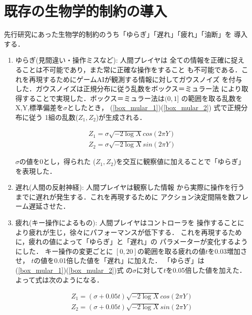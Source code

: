 \documentclass[a4paper,12pt,oneside,openany,titlepage]{jreport}
\begin{document}
 \section{既存の生物学的制約の導入}
 先行研究\cite{morita}にあった生物学的制約のうち「ゆらぎ」「遅れ」「疲れ」「油断」を
 導入する．
 \begin{enumerate}
   \item ゆらぎ(見間違い・操作ミスなど): 人間プレイヤは
   全ての情報を正確に捉えることは不可能であり，また常に正確な操作をすること
   も不可能である．これを再現するためにゲームAIが観測する情報に対してガウスノイズ
   を付与した．ガウスノイズは正規分布に従う乱数をボックス＝ミュラー法
   により取得することで実現した．ボックス＝ミュラー法は$(0,1]$
   の範囲を取る乱数をX,Y,標準偏差を$\sigma$としたとき，
   (\ref{box_mular_1})(\ref{box_mular_2})
   式で正規分布に従う
   1組の乱数($Z_1,Z_2$)が生成される．
   \vspace{-0.7cm}
   \begin{center}
   \large
   \begin{align}\label{box_mular_1}
   Z_1 = \sigma \sqrt{-2 \log X} cos(2\pi Y)\\
   Z_2 = \sigma \sqrt{-2 \log X} sin(2\pi Y)\label{box_mular_2}
   \end{align}
   \normalsize
   \end{center}
   \vspace{0.3cm}
   $\sigma$の値を0とし，得られた
   ($Z_1,Z_2$)を交互に観察値に加えることで「ゆらぎ」を表現した．   

   \item 遅れ(人間の反射神経): 人間プレイヤは観察した情報
   から実際に操作を行うまでに遅れが発生する．これを再現するために
   アクション決定間隔を数フレーム遅延させた．
   \item 疲れ(キー操作によるもの): 人間プレイヤはコントローラを
   操作することにより疲れが生じ，徐々にパフォーマンスが低下する．
   これを再現するために，疲れの値によって「ゆらぎ」と「遅れ」の
   パラメーターが変化するようにした．
   キー操作の変更ごとに
   $[0,20]$の範囲を取る疲れの値$t$を0.03増加させ，
   $t$の値を0.01倍した値を「遅れ」に加えた．   
   「ゆらぎ」は(\ref{box_mular_1})(\ref{box_mular_2})式
   の$\sigma$に対して$t$を0.05倍した値を加えた．
   よって式は次のようになる．
   \vspace{-0.7cm}
   \begin{center}
   \large
   \begin{align}\label{box_mular_3}
   Z_1 = (\sigma + 0.05t) \sqrt{-2 \log X} cos(2\pi Y)\\
   Z_2 = (\sigma + 0.05t) \sqrt{-2 \log X} sin(2\pi Y)\label{box_mular_4}
   \end{align}
   \normalsize
   \end{center}
   \vspace{0.3cm}


\end{enumerate}
\end{document}

